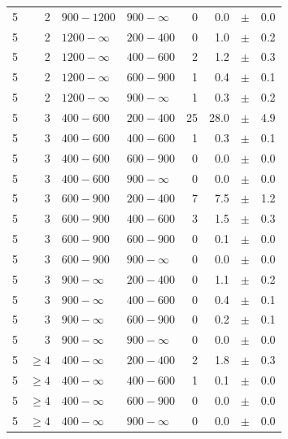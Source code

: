 \begin{table}[!h]
\begin{tabular}{rrllrrcl}
5 & 2 & $ 900-1200$ & $900-\infty$ &      0 &      0.0 &$\pm$&    0.0 \\
5 & 2 & $1200- \infty$ & $200-400$ &      0 &      1.0 &$\pm$&    0.2 \\
5 & 2 & $1200- \infty$ & $400-600$ &      2 &      1.2 &$\pm$&    0.3 \\
5 & 2 & $1200- \infty$ & $600-900$ &      1 &      0.4 &$\pm$&    0.1 \\
5 & 2 & $1200- \infty$ & $900-\infty$ &      1 &      0.3 &$\pm$&    0.2 \\
5 & 3 & $ 400- 600$ & $200-400$ &     25 &     28.0 &$\pm$&    4.9 \\
5 & 3 & $ 400- 600$ & $400-600$ &      1 &      0.3 &$\pm$&    0.1 \\
5 & 3 & $ 400- 600$ & $600-900$ &      0 &      0.0 &$\pm$&    0.0 \\
5 & 3 & $ 400- 600$ & $900-\infty$ &      0 &      0.0 &$\pm$&    0.0 \\
5 & 3 & $ 600- 900$ & $200-400$ &      7 &      7.5 &$\pm$&    1.2 \\
5 & 3 & $ 600- 900$ & $400-600$ &      3 &      1.5 &$\pm$&    0.3 \\
5 & 3 & $ 600- 900$ & $600-900$ &      0 &      0.1 &$\pm$&    0.0 \\
5 & 3 & $ 600- 900$ & $900-\infty$ &      0 &      0.0 &$\pm$&    0.0 \\
5 & 3 & $ 900- \infty$ & $200-400$ &      0 &      1.1 &$\pm$&    0.2 \\
5 & 3 & $ 900- \infty$ & $400-600$ &      0 &      0.4 &$\pm$&    0.1 \\
5 & 3 & $ 900- \infty$ & $600-900$ &      0 &      0.2 &$\pm$&    0.1 \\
5 & 3 & $ 900- \infty$ & $900-\infty$ &      0 &      0.0 &$\pm$&    0.0 \\
5 & $\geq 4$ & $ 400- \infty$ & $200-400$ &      2 &      1.8 &$\pm$&    0.3 \\
5 & $\geq 4$ & $ 400- \infty$ & $400-600$ &      1 &      0.1 &$\pm$&    0.0 \\
5 & $\geq 4$ & $ 400- \infty$ & $600-900$ &      0 &      0.0 &$\pm$&    0.0 \\
5 & $\geq 4$ & $ 400- \infty$ & $900-\infty$ &      0 &      0.0 &$\pm$&    0.0 \\
    \hline
  \end{tabular}
\end{table}

